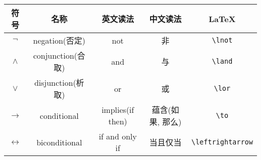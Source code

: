 \begin{table}
    \centering
    \begin{tabular}{|c||c|c|c|c|}
      \hline
      符号& 名称 & 英文读法 & 中文读法 & \LaTeX \\
      \hline \hline
      $\lnot$ & {negation}{(否定)} & not & 非 & \verb|\lnot| \\
      \hline
      $\land$ & {conjunction}{(合取)} & and & 与 & \verb|\land| \\
      \hline
      $\lor$ & {disjunction}{(析取)} & or & 或 & \verb|\lor| \\
      \hline
      $\to$ & conditional & {implies}{(if then)}
        & {蕴含}{(如果, 那么)} & \verb|\to| \\
      \hline
      $\leftrightarrow$ & biconditional & if and only if
        & 当且仅当 & \verb|\leftrightarrow| \\
      \hline
      \end{tabular}%
    \label{fig-conn}
  \end{table}